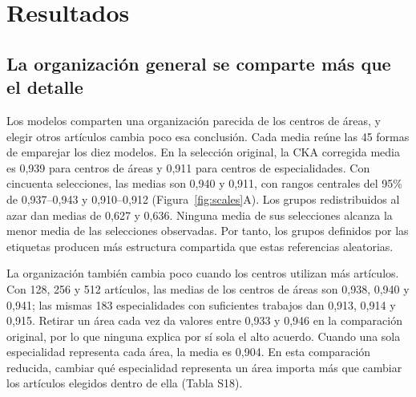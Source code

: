 \documentclass[12pt]{article}
\begin{document}
\section{Resultados}
\FloatBarrier
\subsection{La organización general se comparte más que el detalle}
Los modelos comparten una organización parecida de los centros de áreas, y elegir otros artículos cambia poco esa conclusión. Cada media reúne las 45 formas de emparejar los diez modelos. En la selección original, la CKA corregida media es 0,939 para centros de áreas y 0,911 para centros de especialidades. Con cincuenta selecciones, las medias son 0,940 y 0,911, con rangos centrales del 95\% de 0,937--0,943 y 0,910--0,912 (Figura~\ref{fig:scales}A). Los grupos redistribuidos al azar dan medias de 0,627 y 0,636. Ninguna media de sus selecciones alcanza la menor media de las selecciones observadas. Por tanto, los grupos definidos por las etiquetas producen más estructura compartida que estas referencias aleatorias.

La organización también cambia poco cuando los centros utilizan más artículos. Con 128, 256 y 512 artículos, las medias de los centros de áreas son 0,938, 0,940 y 0,941; las mismas 183 especialidades con suficientes trabajos dan 0,913, 0,914 y 0,915. Retirar un área cada vez da valores entre 0,933 y 0,946 en la comparación original, por lo que ninguna explica por sí sola el alto acuerdo. Cuando una sola especialidad representa cada área, la media es 0,904. En esta comparación reducida, cambiar qué especialidad representa un área importa más que cambiar los artículos elegidos dentro de ella (Tabla S18).
\end{document}
